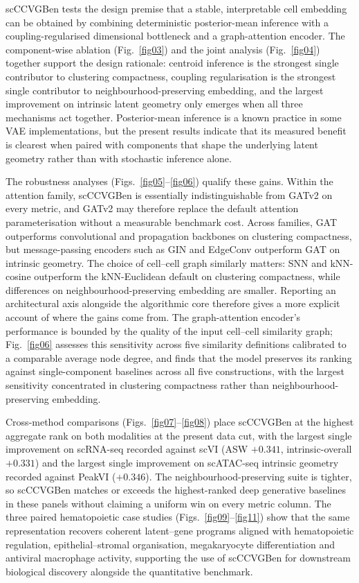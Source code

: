 \documentclass[referee, pdflatex, sn-vancouver-num]{sn-jnl}
\begin{document}
scCCVGBen tests the design premise that a stable, interpretable cell embedding can be obtained by combining deterministic posterior-mean inference with a coupling-regularised dimensional bottleneck and a graph-attention encoder. The component-wise ablation (Fig.~\ref{fig03}) and the joint analysis (Fig.~\ref{fig04}) together support the design rationale: centroid inference is the strongest single contributor to clustering compactness, coupling regularisation is the strongest single contributor to neighbourhood-preserving embedding, and the largest improvement on intrinsic latent geometry only emerges when all three mechanisms act together. Posterior-mean inference is a known practice in some VAE implementations, but the present results indicate that its measured benefit is clearest when paired with components that shape the underlying latent geometry rather than with stochastic inference alone.

The robustness analyses (Figs.~\ref{fig05}--\ref{fig06}) qualify these gains. Within the attention family, scCCVGBen is essentially indistinguishable from GATv2 on every metric, and GATv2 may therefore replace the default attention parameterisation without a measurable benchmark cost. Across families, GAT outperforms convolutional and propagation backbones on clustering compactness, but message-passing encoders such as GIN and EdgeConv outperform GAT on intrinsic geometry. The choice of cell--cell graph similarly matters: SNN and kNN-cosine outperform the kNN-Euclidean default on clustering compactness, while differences on neighbourhood-preserving embedding are smaller. Reporting an architectural axis alongside the algorithmic core therefore gives a more explicit account of where the gains come from. The graph-attention encoder's performance is bounded by the quality of the input cell--cell similarity graph; Fig.~\ref{fig06} assesses this sensitivity across five similarity definitions calibrated to a comparable average node degree, and finds that the model preserves its ranking against single-component baselines across all five constructions, with the largest sensitivity concentrated in clustering compactness rather than neighbourhood-preserving embedding.

Cross-method comparisons (Figs.~\ref{fig07}--\ref{fig08}) place scCCVGBen at the highest aggregate rank on both modalities at the present data cut, with the largest single improvement on scRNA-seq recorded against scVI (ASW $+0.341$, intrinsic-overall $+0.331$) and the largest single improvement on scATAC-seq intrinsic geometry recorded against PeakVI ($+0.346$). The neighbourhood-preserving suite is tighter, so scCCVGBen matches or exceeds the highest-ranked deep generative baselines in these panels without claiming a uniform win on every metric column. The three paired hematopoietic case studies (Figs.~\ref{fig09}--\ref{fig11}) show that the same representation recovers coherent latent--gene programs aligned with hematopoietic regulation, epithelial--stromal organisation, megakaryocyte differentiation and antiviral macrophage activity, supporting the use of scCCVGBen for downstream biological discovery alongside the quantitative benchmark.
\end{document}
